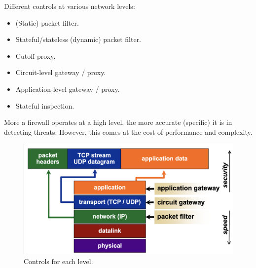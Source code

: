 \noindent Different controls at various network levels:
\begin{itemize}
    \item (Static) packet filter.
    \item Stateful/stateless (dynamic) packet filter.
    \item Cutoff proxy.
    \item Circuit-level gateway / proxy.
    \item Application-level gateway / proxy.
    \item Stateful inspection.
\end{itemize}
\begin{tcolorbox}[colback=blue!10!white, colframe=blue!50!white, title=Accuracy of a Firewall]
More a firewall operates at a high level, the more accurate (specific) it is in detecting threats. However, this comes at the cost of performance and complexity.
\end{tcolorbox}

\begin{figure}[H]
    \centering
  \includegraphics[width=0.5\linewidth]{Images/Firewalling/levels.png}
  \caption{Controls for each level.}
\end{figure}

